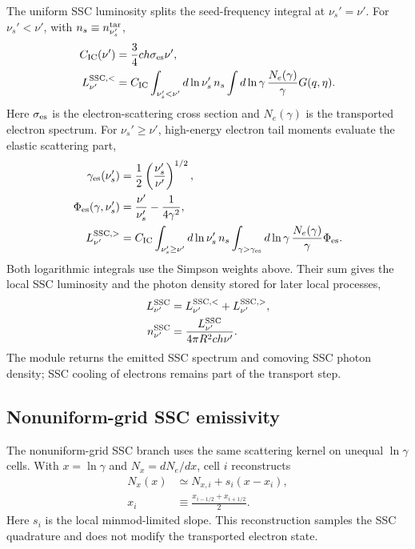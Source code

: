 \documentclass[twocolumn]{aastex702}
\begin{document}
The uniform SSC luminosity splits the seed-frequency integral at \(\nu_s'=\nu'\).
For \(\nu_s'<\nu'\), with \(n_s\equiv n_{\nu_s'}^{\rm tar}\),
\begin{equation}
\begin{aligned}
C_{\rm IC}(\nu')&=\frac{3}{4}ch\sigma_{\rm es}\nu',\\
L_{\nu'}^{{\rm SSC},<}
&=C_{\rm IC}
\int_{\nu_s'<\nu'} d\ln\nu_s'\,n_s
\int d\ln\gamma\,\frac{N_e(\gamma)}{\gamma}
G(q,\eta).
\end{aligned}
\end{equation}
Here \(\sigma_{\rm es}\) is the electron-scattering cross section and
\(N_e(\gamma)\) is the transported electron spectrum.  For
\(\nu_s'\ge\nu'\), high-energy electron tail moments evaluate the elastic
scattering part,
\begin{equation}
\begin{aligned}
\gamma_{\rm es}(\nu_s')
&=\frac{1}{2}\left(\frac{\nu_s'}{\nu'}\right)^{1/2},\\
\Phi_{\rm es}(\gamma,\nu_s')
&=\frac{\nu'}{\nu_s'}-\frac{1}{4\gamma^2},\\
L_{\nu'}^{{\rm SSC},>}
&=C_{\rm IC}
\int_{\nu_s'\ge\nu'}d\ln\nu_s'\,n_s
\int_{\gamma>\gamma_{\rm es}}d\ln\gamma\,
\frac{N_e(\gamma)}{\gamma}
\Phi_{\rm es}.
\end{aligned}
\end{equation}
Both logarithmic integrals use the Simpson weights above.  Their sum gives the
local SSC luminosity and the photon density stored for later local processes,
\begin{equation}
\begin{aligned}
L_{\nu'}^{\rm SSC}
&=L_{\nu'}^{{\rm SSC},<}+L_{\nu'}^{{\rm SSC},>},\\
n_{\nu'}^{\rm SSC}
&=\frac{L_{\nu'}^{\rm SSC}}{4\pi R^2ch\nu'}.
\end{aligned}
\end{equation}
The module returns the emitted SSC spectrum and comoving SSC photon density; SSC
cooling of electrons remains part of the transport step.

\subsection{Nonuniform-grid SSC emissivity}

The nonuniform-grid SSC branch uses the same scattering kernel on unequal
\(\ln\gamma\) cells.  With \(x=\ln\gamma\) and \(N_x=dN_e/dx\), cell \(i\)
reconstructs
\begin{equation}
\begin{aligned}
N_x(x)&\simeq N_{x,i}+s_i(x-x_i),\\
x_i&\equiv \frac{x_{i-1/2}+x_{i+1/2}}{2}.
\end{aligned}
\end{equation}
Here \(s_i\) is the local minmod-limited slope.  This reconstruction samples the
SSC quadrature and does not modify the transported electron state.
\end{document}
